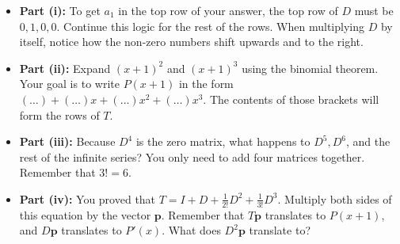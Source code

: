 \begin{hint}
\begin{itemize}
    \item \textbf{Part (i):} To get $a_1$ in the top row of your answer, the top row of $D$ must be $0, 1, 0, 0$. Continue this logic for the rest of the rows. When multiplying $D$ by itself, notice how the non-zero numbers shift upwards and to the right. 
    \item \textbf{Part (ii):} Expand $(x+1)^2$ and $(x+1)^3$ using the binomial theorem. Your goal is to write $P(x+1)$ in the form $(\dots) + (\dots)x + (\dots)x^2 + (\dots)x^3$. The contents of those brackets will form the rows of $T$. 
    \item \textbf{Part (iii):} Because $D^4$ is the zero matrix, what happens to $D^5, D^6$, and the rest of the infinite series? You only need to add four matrices together. Remember that $3! = 6$.
    \item \textbf{Part (iv):} You proved that $T = I + D + \frac{1}{2!}D^2 + \frac{1}{3!}D^3$. Multiply both sides of this equation by the vector $\mathbf{p}$. Remember that $T\mathbf{p}$ translates to $P(x+1)$, and $D\mathbf{p}$ translates to $P'(x)$. What does $D^2\mathbf{p}$ translate to?
\end{itemize}
\end{hint}

